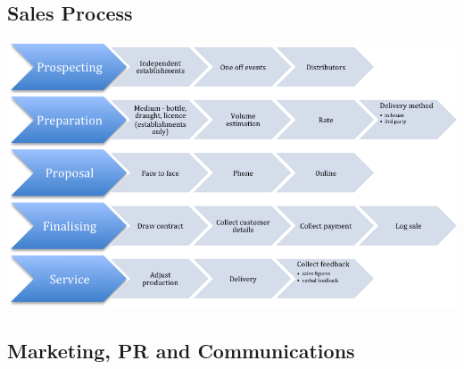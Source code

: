 \documentclass[11pt]{article}
\begin{document}
  \subsection{Sales Process}
  \includegraphics[width=\textwidth,keepaspectratio]{./process.png}
  \subsection{Marketing, PR and Communications}

\newpage
\end{document}
